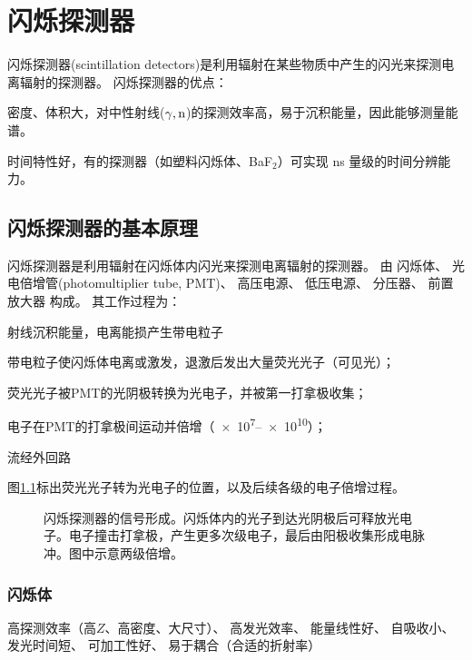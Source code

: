 \chapter{闪烁探测器}

闪烁探测器(scintillation detectors)是利用辐射在某些物质中产生的闪光来探测电离辐射的探测器。
闪烁探测器的优点：
\begin{compactenum}
	\item 密度、体积大，对中性射线($\gamma,\mathrm n$)的探测效率高，易于沉积能量，因此能够测量能谱。
	\item 时间特性好，有的探测器（如塑料闪烁体、BaF$_2$）可实现 \unit{ns} 量级的时间分辨能力。
\end{compactenum}

\section{闪烁探测器的基本原理}

闪烁探测器是利用辐射在闪烁体内闪光来探测电离辐射的探测器。
由
闪烁体、
光电倍增管(photomultiplier tube, PMT)、
高压电源、
低压电源、
分压器、
前置放大器
构成。
其工作过程为：
\begin{compactenum}
	\item 射线沉积能量，电离能损产生带电粒子
	\item 带电粒子使闪烁体电离或激发，退激后发出大量荧光光子（可见光）；
	\item 荧光光子被PMT的光阴极转换为光电子，并被第一打拿极收集；
	\item 电子在PMT的打拿极间运动并倍增（\numrange{e7}{e10}）；
	\item 流经外回路
\end{compactenum}

图\ref{fig:scintillator-pmt}标出荧光光子转为光电子的位置，以及后续各级的电子倍增过程。
\begin{figure}[htbp]
    \centering{}
    \caption{闪烁探测器的信号形成。闪烁体内的光子到达光阴极后可释放光电子。电子撞击打拿极，产生更多次级电子，最后由阳极收集形成电脉冲。图中示意两级倍增。}
    \label{fig:scintillator-pmt}
\end{figure}

\subsection{闪烁体}

高探测效率（高$Z$、高密度、大尺寸）、
高发光效率、
能量线性好、
自吸收小、
发光时间短、
可加工性好、
易于耦合（合适的折射率）
